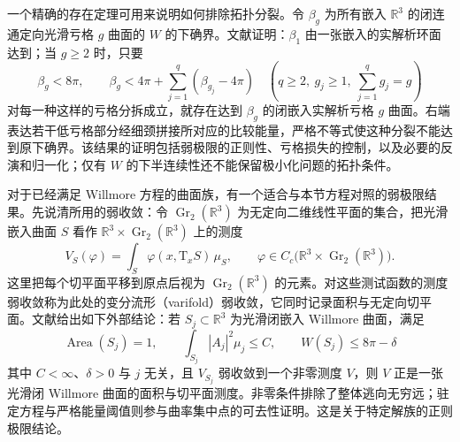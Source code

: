 \ProseParagraphBreak

一个精确的存在定理可用来说明如何排除拓扑分裂。令 \(\beta_g\) 为所有嵌入 \(\mathbb R^3\) 的闭连通定向光滑亏格 \(g\) 曲面的 \(W\) 的下确界。文献\cite[第282页的主要结果；第4节，第320--323页]{Simon1993WillmoreMinimizers}证明：\(\beta_1\) 由一张嵌入的实解析环面达到；当 \(g\ge2\) 时，只要
\begin{equation}\label{g3:eq:willmore-genus-strict-gap}
	\beta_g<8\pi,
	\qquad
	\beta_g<4\pi+\sum_{j=1}^q(\beta_{g_j}-4\pi)
	\quad
	\left(q\ge2,\ g_j\ge1,\ \sum_{j=1}^qg_j=g\right)
\end{equation}
对每一种这样的亏格分拆成立，就存在达到 \(\beta_g\) 的闭嵌入实解析亏格 \(g\) 曲面。右端表达若干低亏格部分经细颈拼接所对应的比较能量，严格不等式使这种分裂不能达到原下确界。该结果的证明包括弱极限的正则性、亏格损失的控制，以及必要的反演和归一化；仅有 \(W\) 的下半连续性还不能保留极小化问题的拓扑条件。

\ProseParagraphBreak

对于已经满足 Willmore 方程的曲面族，有一个适合与本节方程对照的弱极限结果。先说清所用的弱收敛：令 \(\operatorname{Gr}_2(\mathbb R^3)\) 为无定向二维线性平面的集合，把光滑嵌入曲面 \(S\) 看作 \(\mathbb R^3\times\operatorname{Gr}_2(\mathbb R^3)\) 上的测度
\[
	V_S(\varphi)=\int_S\varphi(x,\mathrm T_xS)\,\mu_S,
	\qquad \varphi\in C_c\bigl(\mathbb R^3\times\operatorname{Gr}_2(\mathbb R^3)\bigr).
\]
这里把每个切平面平移到原点后视为 \(\operatorname{Gr}_2(\mathbb R^3)\) 的元素。对这些测试函数的测度弱收敛称为此处的变分流形（varifold）弱收敛，它同时记录面积与无定向切平面。文献\cite[定理5.1，第343--344页]{KuwertSchaetzle2004WillmoreSingularities}给出如下外部结论：若 \(S_j\subset\mathbb R^3\) 为光滑闭嵌入 Willmore 曲面，满足
\[
	\operatorname{Area}(S_j)=1,
	\qquad \int_{S_j}|A_j|^2\mu_j\le C,
	\qquad W(S_j)\le8\pi-\delta
\]
其中 \(C<\infty\)、\(\delta>0\) 与 \(j\) 无关，且 \(V_{S_j}\) 弱收敛到一个非零测度 \(V\)，则 \(V\) 正是一张光滑闭 Willmore 曲面的面积与切平面测度。非零条件排除了整体逃向无穷远；驻定方程与严格能量阈值则参与曲率集中点的可去性证明。这是关于特定解族的正则极限结论。

\ProseParagraphBreak

